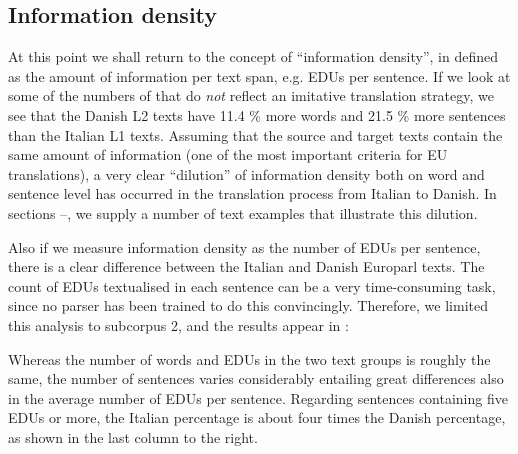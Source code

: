 \documentclass[output=paper]{LSP/langsci}
\begin{document}
\subsection{Information density}\label{sec:korzen:3.3}

At this point we shall return to the concept of ``information density'', in  defined as the amount of information per text span, e.g. EDUs per sentence. If we look at some of the numbers of  that do \textit{not} reflect an imitative translation strategy, we see that the Danish L2 texts have 11.4 \% more words and 21.5 \% more sentences than the Italian L1 texts. Assuming that the source and target texts contain the same amount of information (one of the most important criteria for EU translations), a very clear ``dilution'' of information density both on word and sentence level has occurred in the translation process from Italian to Danish. In sections --, we supply a number of text examples that illustrate this dilution.

Also if we measure information density as the number of EDUs per sentence, there is a clear difference between the Italian and Danish Europarl texts. The count of EDUs textualised in each sentence can be a very time-consuming task, since no parser has been trained to do this convincingly. Therefore, we limited this analysis to subcorpus 2, and the results appear in :

\begin{table}[t]
\caption{Statistics on Europarl subcorpus 2.}
\label{tab:korzen:4}
\end{table} 

Whereas the number of words and EDUs in the two text groups is roughly the same, the number of sentences varies considerably entailing great differences also in the average number of EDUs per sentence. Regarding sentences containing five EDUs or more, the Italian percentage is about four times the Danish percentage, as shown in the last column to the right.
\end{document}

